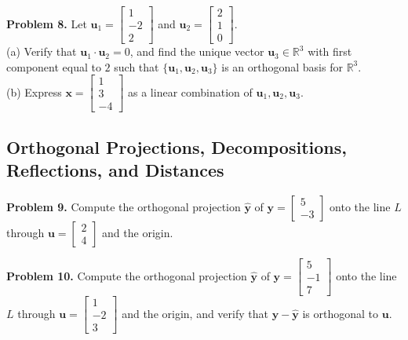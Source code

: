 \documentclass[11pt, letterpaper]{article}
\theoremstyle{definition}
\theoremstyle{remark}
\begin{document}
\textbf{Problem 8.} Let $\mathbf{u}_1 = \begin{bmatrix} 1 \\ -2 \\ 2 \end{bmatrix}$ and $\mathbf{u}_2 = \begin{bmatrix} 2 \\ 1 \\ 0 \end{bmatrix}$. \\
(a) Verify that $\mathbf{u}_1 \cdot \mathbf{u}_2 = 0$, and find the unique vector $\mathbf{u}_3 \in \mathbb{R}^3$ with first component equal to $2$ such that $\{\mathbf{u}_1, \mathbf{u}_2, \mathbf{u}_3\}$ is an orthogonal basis for $\mathbb{R}^3$. \\
(b) Express $\mathbf{x} = \begin{bmatrix} 1 \\ 3 \\ -4 \end{bmatrix}$ as a linear combination of $\mathbf{u}_1, \mathbf{u}_2, \mathbf{u}_3$.

\subsection{Orthogonal Projections, Decompositions, Reflections, and Distances}

\textbf{Problem 9.} Compute the orthogonal projection $\hat{\mathbf{y}}$ of $\mathbf{y} = \begin{bmatrix} 5 \\ -3 \end{bmatrix}$ onto the line $L$ through $\mathbf{u} = \begin{bmatrix} 2 \\ 4 \end{bmatrix}$ and the origin.

\textbf{Problem 10.} Compute the orthogonal projection $\hat{\mathbf{y}}$ of $\mathbf{y} = \begin{bmatrix} 5 \\ -1 \\ 7 \end{bmatrix}$ onto the line $L$ through $\mathbf{u} = \begin{bmatrix} 1 \\ -2 \\ 3 \end{bmatrix}$ and the origin, and verify that $\mathbf{y} - \hat{\mathbf{y}}$ is orthogonal to $\mathbf{u}$.
\end{document}
